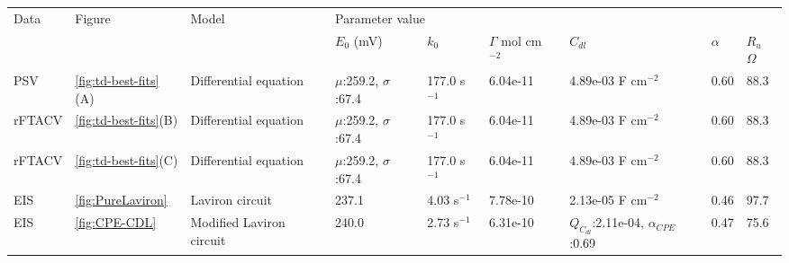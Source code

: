 \begin{table}[]
\begin{tabular}{|l|l|l|llllll|}
\hline
\multirow{2}{*}{Data} & \multirow{2}{*}{Figure} & \multirow{2}{*}{Model} & \multicolumn{6}{l|}{Parameter value}                                                                                                                                                         \\ \cline{4-9} 
                        &                         &                        & \multicolumn{1}{l|}{$E_0$ (mV)} & \multicolumn{1}{l|}{$k_0$} & \multicolumn{1}{l|}{$\Gamma$ mol cm $^{-2}$} & \multicolumn{1}{l|}{$C_{dl}$} & \multicolumn{1}{l|}{$\alpha$} & $R_u$ $\Omega$ \\ \hline
PSV &                     \ref{fig:td-best-fits}(A) &                       Differential equation &                      \multicolumn{1}{l|}{$\mu$:259.2, $\sigma$:67.4}&           \multicolumn{1}{l|}{177.0 s$^{-1}$}&      \multicolumn{1}{l|}{6.04e-11}&                        \multicolumn{1}{l|}{4.89e-03 F cm$^{-2}$}&         \multicolumn{1}{l|}{0.60}&         88.3              \\ \hline
rFTACV &                     \ref{fig:td-best-fits}(B) &                       Differential equation &                      \multicolumn{1}{l|}{$\mu$:259.2, $\sigma$:67.4}&           \multicolumn{1}{l|}{177.0 s$^{-1}$}&      \multicolumn{1}{l|}{6.04e-11}&                        \multicolumn{1}{l|}{4.89e-03 F cm$^{-2}$}&         \multicolumn{1}{l|}{0.60}&         88.3              \\ \hline
rFTACV &                     \ref{fig:td-best-fits}(C) &                       Differential equation &                      \multicolumn{1}{l|}{$\mu$:259.2, $\sigma$:67.4}&           \multicolumn{1}{l|}{177.0 s$^{-1}$}&      \multicolumn{1}{l|}{6.04e-11}&                        \multicolumn{1}{l|}{4.89e-03 F cm$^{-2}$}&         \multicolumn{1}{l|}{0.60}&         88.3              \\ \hline
EIS &                     \ref{fig:PureLaviron} &                       Laviron circuit &                      \multicolumn{1}{l|}{237.1}&           \multicolumn{1}{l|}{4.03 s$^{-1}$}&      \multicolumn{1}{l|}{7.78e-10}&                        \multicolumn{1}{l|}{2.13e-05 F cm$^{-2}$}&         \multicolumn{1}{l|}{0.46}&         97.7              \\ \hline
EIS &                     \ref{fig:CPE-CDL} &                       Modified Laviron circuit &                      \multicolumn{1}{l|}{240.0}&           \multicolumn{1}{l|}{2.73 s$^{-1}$}&      \multicolumn{1}{l|}{6.31e-10}&                        \multicolumn{1}{l|}{$Q_{C_{dl}}$:2.11e-04, $\alpha_{CPE}$:0.69}&         \multicolumn{1}{l|}{0.47}&         75.6              \\ \hline

\end{tabular}
\end{table}
